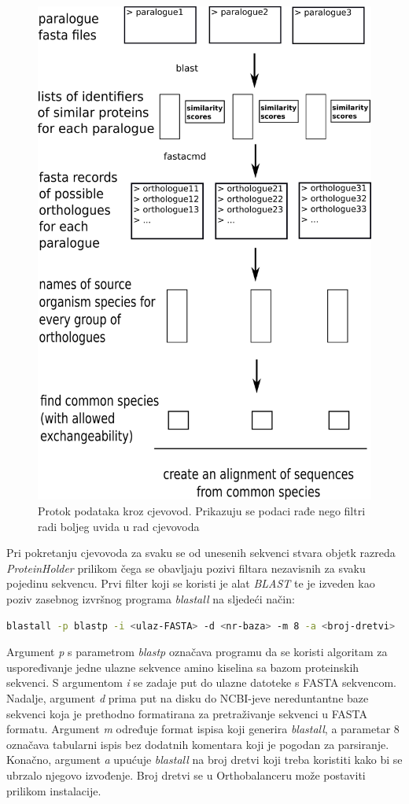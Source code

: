 \begin{figure}[h!]
\centering
\includegraphics[width=4.5in]{figures/cjevovod.png}
\caption{Protok podataka kroz cjevovod. Prikazuju se podaci rađe nego filtri
radi boljeg uvida u rad cjevovoda}
\label{fig:cjevovod}
\end{figure}

Pri pokretanju cjevovoda za svaku se od unesenih sekvenci stvara objetk razreda
\emph{ProteinHolder} prilikom čega se obavljaju pozivi filtara nezavisnih za
svaku pojedinu sekvencu. Prvi filter koji se koristi je alat \emph{BLAST} te je
izveden kao poziv zasebnog izvršnog programa \emph{blastall} na sljedeći način:
\begin{lstlisting}[language=bash]
blastall -p blastp -i <ulaz-FASTA> -d <nr-baza> -m 8 -a <broj-dretvi>
\end{lstlisting}
Argument \emph{p} s parametrom \emph{blastp} označava programu da se koristi
algoritam za uspoređivanje jedne ulazne sekvence amino kiselina sa bazom
proteinskih sekvenci. S argumentom \emph{i} se zadaje put do ulazne datoteke s
FASTA sekvencom. Nadalje, argument \emph{d} prima put na disku do NCBI-jeve 
nereduntantne baze sekvenci koja je prethodno formatirana za pretraživanje
sekvenci u FASTA formatu. Argument \emph{m} određuje format ispisa koji generira
\emph{blastall}, a parametar 8 označava tabularni ispis bez dodatnih komentara
koji je pogodan za parsiranje. Konačno, argument \emph{a} upućuje
\emph{blastall} na broj dretvi koji treba koristiti kako bi se ubrzalo njegovo
izvođenje. Broj dretvi se u Orthobalanceru može postaviti prilikom instalacije.

